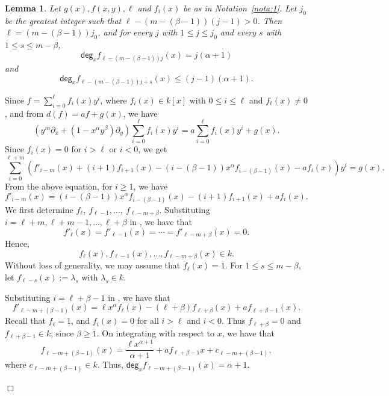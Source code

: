 \documentclass[12pt,reqno]{amsart}
\renewcommand{\deg}{\mathsf{deg}}
\renewcommand{\leq}{\leqslant}
\renewcommand{\geq}{\geqslant}
\numberwithin{thm}{section}
\newtheorem{lem}[thm]{Lemma}
\theoremstyle{definition}
\numberwithin{equation}{thm}
\renewenvironment{proof}{\par\noindent {\em Proof:}}{\hfill$\Box$\medskip}
\theoremstyle{plain}
\begin{document}
\begin{lem}\label{deglem}
Let $g(x),f(x,y),\ell$ and $f_i(x)$ be as in Notation~\ref{nota:1}. Let $j_0$ be the greatest integer such that $\ell-(m-(\beta-1))(j-1)>0$. Then $\ell=(m-(\beta-1))j_0$, and for every $j$ with $1\leq j\leq j_0$ and every $s$ with $1\leq s\leq m-\beta$, $$\deg_x f_{\ell-(m-(\beta-1))j}(x)=j(\alpha+1)$$
and
$$\deg_x f_{\ell-(m-(\beta-1))j+s}(x)\leq (j-1)(\alpha+1).$$
\end{lem}
\begin{proof}
Since $f=\sum_{i=0}^{\ell}f_i(x)y^i$, where $f_i(x)\in k[x]$ with $0\leq i \leq \ell$ and $f_\ell(x)\ne 0$, and from $d(f)=af+g(x)$, we have
\begin{equation}
(y^m\partial_x+(1-x^\alpha y^\beta)\partial_y)
\sum_{i=0}^{\ell}f_i(x)y^i=a\sum_{i=0}^{\ell}f_i(x)y^i +g(x).
\end{equation}
Since $f_i(x)=0$ for $i>\ell$ or $i<0$, we get
\begin{equation}\label{eq1:2}
\sum_{i=0}^{\ell+m}
\left(f'_{i-m}(x)+(i+1)f_{i+1}(x)-(i-(\beta-1))x^\alpha f_{i-(\beta-1)}(x)-af_i(x)\right)y^i
=g(x).
\end{equation}
From the above equation, for $i\geq1$, we have
\begin{equation}\label{eq1:3}
f'_{i-m}(x)=(i-(\beta-1))x^\alpha f_{i-(\beta-1)}(x)-(i+1)f_{i+1}(x)+af_i(x).
\end{equation}
\noindent  We first determine $f_\ell, \ f_{\ell-1},\ldots, \ f_{\ell-m+\beta}$.  
Substituting $i=\ell+m,\ell+m-1,\dots,\ell+\beta$ in , we have that
$$f'_\ell(x)=f'_{\ell-1}(x)=\cdots=f'_{\ell-m+\beta}(x)=0.$$
Hence,
\begin{equation}\label{eq1:4}
f_\ell(x),f_{\ell-1}(x),\dots,f_{\ell-m+\beta}(x)\in k.
\end{equation}
Without loss of generality, we may assume that $f_\ell(x)=1$.  
For $1\leq s\leq m-\beta$, let $f_{\ell-s}(x):=\lambda_s$ with $\lambda_s\in k$.

\medskip 

\noindent Substituting $i=\ell+\beta-1$ in , we have that
\begin{equation}\label{eq1:5}
    f'_{\ell-m+(\beta-1)}(x)=\ell x^\alpha f_\ell(x)-(\ell+\beta)f_{\ell+\beta}(x)+af_{\ell+\beta-1}(x).
\end{equation}
Recall that $f_{\ell}=1$, and $f_i(x)=0$ for all $i>\ell$ and $i<0$. Thus $f_{\ell+\beta}=0$ and $f_{\ell+\beta-1}\in k$, since $\beta \geq 1$. On integrating  with respect to $x$, we have that
\begin{equation}\label{eq1:6}
f_{\ell-m+(\beta-1)}(x)=\frac{\ell x^{\alpha+1}}{\alpha+1}+af_{\ell+\beta-1}x+c_{\ell-m+(\beta-1)},
\end{equation} where $c_{\ell-m+(\beta-1)}\in k.$
 Thus, $\deg_x f_{\ell-m+(\beta-1)}(x)=\alpha+1$.


\end{proof}
\end{document}
